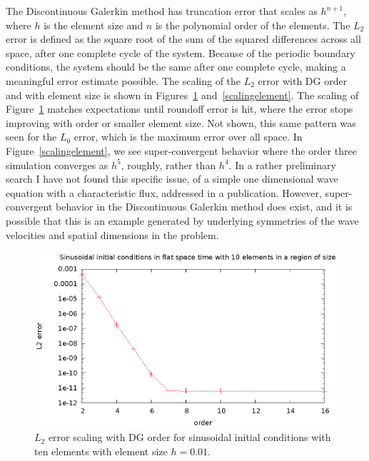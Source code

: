 The Discontinuous Galerkin method has truncation error that scales as $h^{n+1}$, where $h$ is the element size and $n$ is the polynomial order of the elements. The $L_2$ error is defined as the square root of the sum of the squared differences across all space, after one complete cycle of the system. Because of the periodic boundary conditions, the system should be the same after one complete cycle, making a meaningful error estimate possible. The scaling of the $L_2$ error with DG order and with element size is shown in Figures~\ref{scalingorder} and~\ref{scalingelement}. The scaling of Figure~\ref{scalingorder} matches expectations until roundoff error is hit, where the error stops improving with order or smaller element size. Not shown, this same pattern was seen for the $L_0$ error, which is the maximum error over all space. In Figure~\ref{scalingelement}, we see super-convergent behavior where the order three simulation converges as $h^5$, roughly, rather than $h^4$. In a rather preliminary search I have not found this specific issue, of a simple one dimensional wave equation with a characteristic flux, addressed in a publication. However, super-convergent behavior in the Discontinuous Galerkin method does exist, and it is possible that this is an example generated by underlying symmetries of the wave velocities and spatial dimensions in the problem. 

\begin{figure}
  \includegraphics{sinL2WTorder}
  \caption{$L_2$ error scaling with DG order for sinusoidal initial conditions with ten elements with element size $h=0.01$.}
  \label{scalingorder}
\end{figure}


